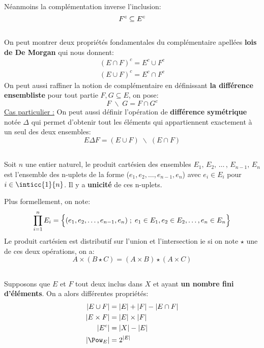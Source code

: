 Néanmoins la complémentation inverse l'inclusion:
\[ 
    F^c \subseteq E^c \\
\]
\subsection*{}
On peut montrer deux propriétés fondamentales du complémentaire apellées \textbf{lois de De Morgan} qui nous donnent:
\begin{align*}
    (E \cap F)^c = E^c \cup F^c \\
    (E \cup F)^c = E^c \cap F^c
\end{align*}
On peut aussi raffiner la notion de complémentaire en définissant \textbf{la différence ensembliste} pour tout partie \(F, G \subseteq E\), on pose:
\[
   F \;\backslash\; G = F \cap G^c  
\]
\underline{Cas particulier {:}}
On peut aussi définir l'opération de \textbf{différence symétrique} notée \(\Delta\) qui permet d'obtenir tout les éléments qui appartiennent exactement à un seul des deux ensembles:
\[
   E \Delta F = (E \cup F) \;\backslash\; (E \cap F)   
\]
\subsection*{}

Soit \(n\) une entier naturel, le produit cartésien des ensembles \(E_1,\, E_2,\, \ldots\,,\, E_{n-1},\, E_n\) est l'ensemble des n-uplets de la forme (\(e_1, e_2, \ldots, e_{n-1}, e_n\)) avec \(e_i \in E_i\) pour \(i \in \inticc{1}{n}\).
Il y a \textbf{unicité} de ces n-uplets.

Plus formellement, on note:
\[
     \prod_{i=1}^{n} E_i = \Bigl\{ (e_1, e_2, \ldots, e_{n-1}, e_n) \; ; \; e_1 \in E_1, e_2 \in E_2, \ldots,  e_n \in E_n \Bigl\}
\]
Le produit cartésien est distributif sur l'union et l'intersection ie si on note \( \star \) une de ces deux opérations, on a:
\[ 
   A \times (B \star C) = (A \times B) \star (A \times C) 
\]
\pagebreak
\subsection*{}

Supposons que \(E\) et \(F\) tout deux inclus dans \(X\) et ayant \textbf{un nombre fini d'éléments}. On a alors différentes propriétés:
\begin{align*}
    |E \cup F| &= |E| + |F| - |E \cap F| \\
    |E \times F| &= |E| \times |F| \\
    |E^c| &= |X| - |E| \\
    |\Pow_E| &= 2^{|E|}
\end{align*}
